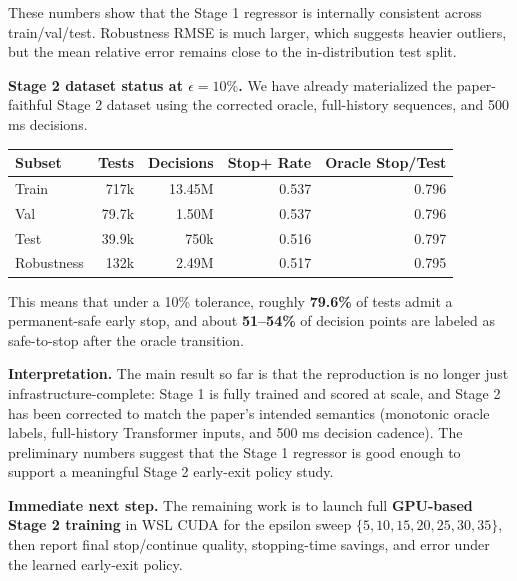 \documentclass[10pt]{article}
\begin{document}
These numbers show that the Stage 1 regressor is internally consistent across train/val/test. Robustness RMSE is much larger, which suggests heavier outliers, but the mean relative error remains close to the in-distribution test split.

\textbf{Stage 2 dataset status at $\epsilon = 10\%$.} We have already materialized the paper-faithful Stage 2 dataset using the corrected oracle, full-history sequences, and 500 ms decisions.

\begin{center}
\begin{tabular}{|l|r|r|r|r|}
\hline
Subset & Tests & Decisions & Stop+ Rate & Oracle Stop/Test \\
\hline
Train & 717k & 13.45M & 0.537 & 0.796 \\
Val & 79.7k & 1.50M & 0.537 & 0.796 \\
Test & 39.9k & 750k & 0.516 & 0.797 \\
Robustness & 132k & 2.49M & 0.517 & 0.795 \\
\hline
\end{tabular}
\end{center}

This means that under a 10\% tolerance, roughly \textbf{79.6\%} of tests admit a permanent-safe early stop, and about \textbf{51--54\%} of decision points are labeled as safe-to-stop after the oracle transition.

\textbf{Interpretation.} The main result so far is that the reproduction is no longer just infrastructure-complete: Stage 1 is fully trained and scored at scale, and Stage 2 has been corrected to match the paper's intended semantics (monotonic oracle labels, full-history Transformer inputs, and 500 ms decision cadence). The preliminary numbers suggest that the Stage 1 regressor is good enough to support a meaningful Stage 2 early-exit policy study.

\textbf{Immediate next step.} The remaining work is to launch full \textbf{GPU-based Stage 2 training} in WSL CUDA for the epsilon sweep $\{5,10,15,20,25,30,35\}$, then report final stop/continue quality, stopping-time savings, and error under the learned early-exit policy.
\end{document}
